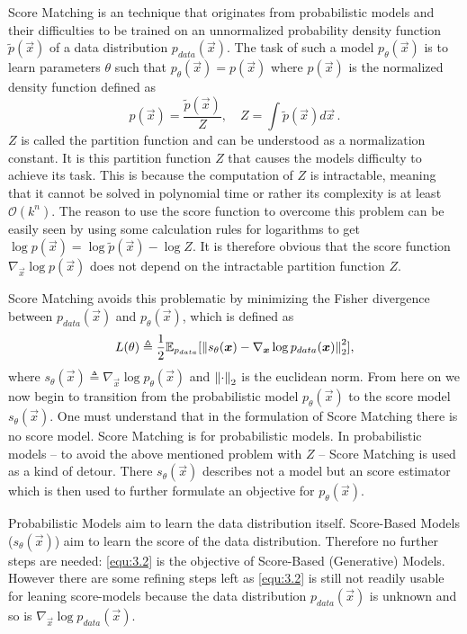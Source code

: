 Score Matching \cite{score_matching_original} is an technique that originates from probabilistic models and their difficulties to be trained on an unnormalized probability density function $\tilde{p}(\vec{x})$ of a data distribution $p_{data}(\vec{x})$. The task of such a model $p_\theta(\vec{x})$ is to learn parameters $\theta$ such that $p_\theta(\vec{x})=p(\vec{x})$ where $p(\vec{x})$ is the normalized density function defined as
%
\begin{equation}
    p(\vec{x})=\frac{\tilde{p}(\vec{x})}{Z},\quad Z=\int\tilde{p}(\vec{x})d\vec{x}\,.
\end{equation}
%
$Z$ is called the partition function and can be understood as a normalization constant. It is this partition function $Z$ that causes the models difficulty to achieve its task. This is because the computation of $Z$ is intractable, meaning that it cannot be solved in polynomial time or rather its complexity is at least $\mathcal{O}(k^n)$. The reason to use the score function to overcome this problem can be easily seen by using some calculation rules for logarithms to get $\log p(\vec{x})=\log\tilde{p}(\vec{x})-\log Z$. It is therefore obvious that the score function $\nabla_{\vec{x}}\log p(\vec{x})$ does not depend on the intractable partition function $Z$.

Score Matching avoids this problematic by minimizing the Fisher divergence between $p_{data}(\vec{x})$ and $p_\theta(\vec{x})$, which is defined as
%
\begin{equation} \label{equ:3.2}
    L(\theta)\triangleq\frac{1}{2}\mathbb{E}_{p_{data}}[\left\lVert s_\theta(\boldsymbol{x})-\nabla_{\boldsymbol{x}}\log p_{data}(\boldsymbol{x})\right\rVert^2_2],
\end{equation}
%
where $s_\theta(\vec{x})\triangleq\nabla_{\vec{x}}\log p_\theta(\vec{x})$ and $\left\lVert\cdot\right\rVert_2$ is the euclidean norm. From here on we now begin to transition from the probabilistic model $p_\theta(\vec{x})$ to the score model $s_\theta(\vec{x})$. One must understand that in the formulation of Score Matching there is no score model. Score Matching is for probabilistic models. In probabilistic models – to avoid the above mentioned problem with $Z$ – Score Matching is used as a kind of detour. There $s_\theta(\vec{x})$ describes not a model but an score estimator which is then used to further formulate an objective for $p_\theta(\vec{x})$. 

Probabilistic Models aim to learn the data distribution itself. Score-Based Models ($s_\theta(\vec{x})$) aim to learn the score of the data distribution. Therefore no further steps are needed: \cref{equ:3.2} is the objective of Score-Based (Generative) Models. However there are some refining steps left as \cref{equ:3.2} is still not readily usable for leaning score-models because the data distribution $p_{data}(\vec{x})$ is unknown and so is $\nabla_{\vec{x}}\log p_{data}(\vec{x})$. 

